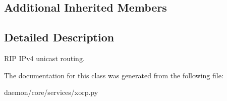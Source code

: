 \subsection*{Additional Inherited Members}


\subsection{Detailed Description}
\begin{DoxyVerb}RIP IPv4 unicast routing.
\end{DoxyVerb}
 

The documentation for this class was generated from the following file\+:\begin{DoxyCompactItemize}
\item 
daemon/core/services/xorp.\+py\end{DoxyCompactItemize}
